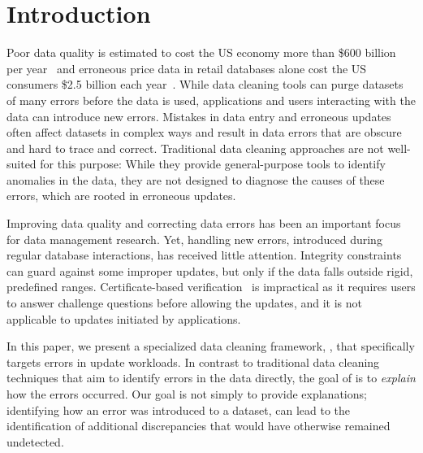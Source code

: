 
\section{Introduction}
\label{s:intro}

Poor data quality is estimated to cost the US economy more than \$600 billion
per year~\cite{eckerson2002} and erroneous price data in retail databases
alone cost the US consumers \$2.5 billion each year~\cite{Fan2008}. While data
cleaning tools can purge datasets of many errors before the data is used,
applications and users interacting with the data can introduce new errors.
Mistakes in data entry and erroneous updates often affect datasets in complex
ways and result in data errors that are obscure and hard to trace and correct.
Traditional data cleaning approaches are not well-suited for this purpose:
While they provide general-purpose tools to identify anomalies in the data,
they are not designed to diagnose the causes of these errors, which are rooted
in erroneous updates.

Improving data quality and correcting data errors has been an important focus
for data management research. Yet, handling new errors, introduced during
regular database interactions, has received little attention. Integrity
constraints~\cite{???} can guard against some improper updates, but only if
the data falls outside rigid, predefined ranges. Certificate-based
verification~\cite{???} is impractical as it requires users to answer
challenge questions before allowing the updates, and it is not applicable to
updates initiated by applications. 

In this paper, we present a specialized data cleaning framework, \sys, that
specifically targets errors in update workloads. In contrast to traditional
data cleaning techniques that aim to identify errors in the data directly, the
goal of \sys is to \emph{explain} how the errors occurred. Our goal is not
simply to provide explanations; identifying how an error was introduced to a
dataset, can lead to the identification of additional discrepancies that would
have otherwise remained undetected.

